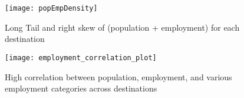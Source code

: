 \chapter{}


\begin{figure}[H]
\centering
\texttt{[image: popEmpDensity]}
\caption{Long Tail and right skew of (population + employment) for each destination}
\label{fig:pop-emp-density}
\end{figure}


\begin{figure}[H]
\centering
\texttt{[image: employment\_correlation\_plot]}
\caption{High correlation between population, employment, and various employment categories across destinations}
\label{fig:pop-emp-correlation}
\end{figure}

